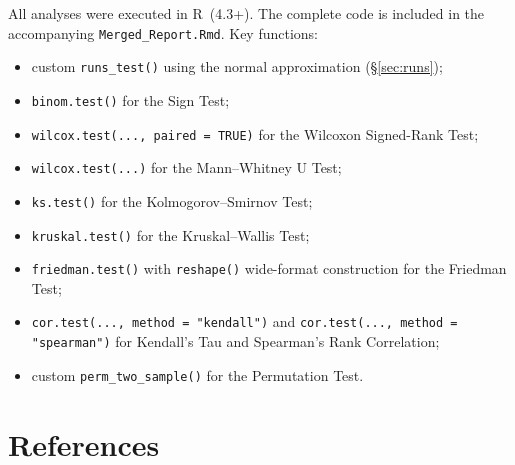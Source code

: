\documentclass[12pt]{article}
\begin{document}
All analyses were executed in R~(4.3+). The complete code is included
in the accompanying \texttt{Merged\_Report.Rmd}. Key functions:

\begin{itemize}[nosep]
  \item custom \texttt{runs\_test()} using the normal approximation
    (\S\ref{sec:runs});
  \item \texttt{binom.test()} for the Sign Test;
  \item \texttt{wilcox.test(..., paired = TRUE)} for the Wilcoxon
    Signed-Rank Test;
  \item \texttt{wilcox.test(...)} for the Mann--Whitney U Test;
  \item \texttt{ks.test()} for the Kolmogorov--Smirnov Test;
  \item \texttt{kruskal.test()} for the Kruskal--Wallis Test;
  \item \texttt{friedman.test()} with \texttt{reshape()} wide-format
    construction for the Friedman Test;
  \item \texttt{cor.test(..., method = "kendall")} and
    \texttt{cor.test(..., method = "spearman")} for Kendall's Tau
    and Spearman's Rank Correlation;
  \item custom \texttt{perm\_two\_sample()} for the Permutation Test.
\end{itemize}

\newpage
\section{References}
\end{document}
